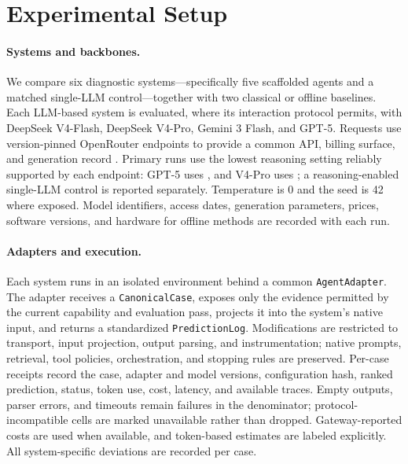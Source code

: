 \documentclass[letterpaper]{article} %
\begin{document}
\section{Experimental Setup}
\label{sec-5}

\paragraph{Systems and backbones.}
\label{sec-5-2}
We compare six diagnostic systems---specifically five scaffolded agents and a
matched single-LLM control---together with two classical or offline baselines. Each LLM-based system is evaluated, where its
interaction protocol permits, with DeepSeek V4-Flash, DeepSeek V4-Pro,
Gemini 3 Flash, and GPT-5. Requests use version-pinned OpenRouter endpoints to
provide a common API, billing surface, and generation record
\citep{openrouter2026api}. Primary runs use the lowest reasoning setting
reliably supported by each endpoint: GPT-5 uses
, and V4-Pro uses
; a reasoning-enabled single-LLM control is
reported separately. Temperature is 0 and the seed is 42 where exposed. Model
  identifiers, access dates, generation parameters, prices,
  software versions, and hardware for offline methods are recorded
  with each run.

\paragraph{Adapters and execution.}
\label{sec-5-3}
Each system runs in an isolated environment behind a common
\texttt{AgentAdapter}. The adapter receives a \texttt{CanonicalCase}, exposes
only the evidence permitted by the current capability and evaluation pass,
projects it into the system's native input, and returns a standardized
\texttt{PredictionLog}. Modifications are restricted to transport, input
projection, output parsing, and instrumentation; native prompts, retrieval,
tool policies, orchestration, and stopping rules are preserved. Per-case
receipts record the case, adapter and model versions, configuration hash,
ranked prediction, status, token use, cost, latency, and available traces.
Empty outputs, parser errors, and timeouts remain failures in the denominator;
protocol-incompatible cells are marked unavailable rather than dropped.
Gateway-reported costs are used when available, and
  token-based estimates are labeled explicitly. All
  system-specific deviations are recorded per case.
\end{document}
